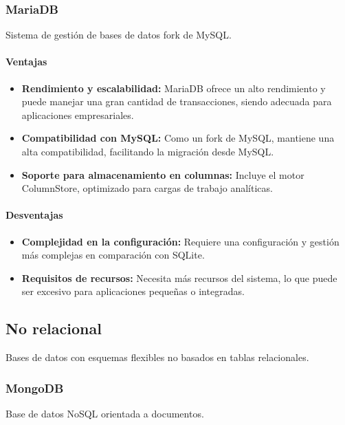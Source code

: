 \subsubsection{MariaDB}
Sistema de gestión de bases de datos fork de MySQL.

\paragraph{Ventajas}
\begin{itemize}
    \item \textbf{Rendimiento y escalabilidad:} MariaDB ofrece un alto rendimiento y puede manejar una gran cantidad de transacciones, siendo adecuada para aplicaciones empresariales.
    
    \item \textbf{Compatibilidad con MySQL:} Como un fork de MySQL, mantiene una alta compatibilidad, facilitando la migración desde MySQL.
    
    \item \textbf{Soporte para almacenamiento en columnas:} Incluye el motor ColumnStore, optimizado para cargas de trabajo analíticas.
\end{itemize}

\paragraph{Desventajas}
\begin{itemize}
    \item \textbf{Complejidad en la configuración:} Requiere una configuración y gestión más complejas en comparación con SQLite.
    
    \item \textbf{Requisitos de recursos:} Necesita más recursos del sistema, lo que puede ser excesivo para aplicaciones pequeñas o integradas.
\end{itemize}

\subsection{No relacional}
Bases de datos con esquemas flexibles no basados en tablas relacionales.

\subsubsection{MongoDB}
Base de datos NoSQL orientada a documentos.

